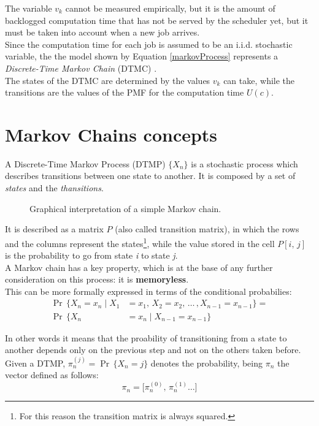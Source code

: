 The variable \( v_{k} \) cannot be measured empirically, but it is the amount of backlogged computation time that has not be served by the scheduler yet, but it must be taken into account when a new job arrives.\\
Since the computation time for each job is assumed to be an i.i.d. stochastic variable, the the model shown by Equation \ref{markovProcess} represents a \emph{Discrete-Time Markov Chain} (DTMC) \cite{probGuarantees} \cite{effRobustGuarantees}.\\
The states of the DTMC are determined by the values \( v_{k} \) can take, while the transitions are the values of the PMF for the computation time \( U(c) \).

\section{Markov Chains concepts}
A Discrete-Time Markov Process (DTMP) \( \{X_{n}\} \) is a stochastic process which describes transitions between one state to another. It is composed by a set of \emph{states} and the \emph{thansitions}.
\begin{figure}[H]
  \caption{Graphical interpretation of a simple Markov chain.}
  \label{automaton}
\end{figure}

It is described as a matrix \( P \) (also called transition matrix), in which the rows and the columns represent the states\footnote{For this reason the transition matrix is always squared.}, while the value stored in the cell \( P[i,\,j] \) is the probability to go from state \emph{i} to state \emph{j}.\\
A Markov chain has a key property, which is at the base of any further consideration on this process: it is \textbf{memoryless}.\\
This can be more formally expressed in terms of the conditional probabilies:
\begin{equation} \tag{3} \label{memoryless}
\begin{split}
  \Pr\,\{X_{n} = x_{n} \mid X_{1} &= x_{1},\,X_{2} = x_{2},\,\dots\,, X_{n-1} = x_{n-1} \} =\\
  \Pr\,\{X_{n} &= x_{n} \mid X_{n-1} = x_{n-1}  \}
\end{split}
\end{equation}

In other words it means that the proability of transitioning from a state to another depends only on the previous step and not on the others taken before.\\
Given a DTMP, \( \pi_{n}^{(j)} = \Pr\,\{X_{n} = j\}\) denotes the probability, being \( \pi_{n} \) the vector defined as follows:
\begin{equation*}
  \pi_{n} =  \big[\pi_{n}^{(0)},\,\pi_{n}^{(1)} \dots \big]
\end{equation*}


